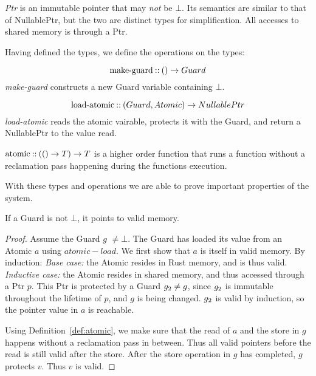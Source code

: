 \begin{definition}[Ptr]
  \emph{Ptr} is an immutable pointer that may \emph{not} be $\bot$. Its semantics are similar to
  that of NullablePtr, but the two are distinct types for simplification. All accesses to shared
  memory is through a Ptr.
\end{definition}


Having defined the types, we define the operations on the types:

\begin{definition}
\begin{equation}\label{eq:make-guard}
  \text{make-guard\:::\:} () \to Guard
\end{equation}
\emph{make-guard} constructs a new Guard variable containing $\bot$.

\begin{equation}\label{eq:load-atomic}
  \text{load-atomic\:::\:} (Guard, Atomic) \to NullablePtr
\end{equation}
\emph{load-atomic} reads the atomic vairable, protects it with the Guard, and return a NullablePtr
to the value read.
\end{definition}

\begin{definition}\label{def:atomic}
  $\text{atomic\:::\:} (() \to T) \to T$ is a higher order function that runs a function without
  a reclamation pass happening during the functions execution.
\end{definition}




With these types and operations we are able to prove important properties of the system.

\begin{theorem}\label{thm:guard-valid}
  If a Guard is not $\bot$, it points to valid memory.
\end{theorem}
\begin{proof}
  Assume the Guard $g$ $\neq \bot$.
  The Guard has loaded its value from an Atomic $a$ using $atomic-load$.
We first show that $a$ is itself in valid memory. By induction:
\emph{Base case:} the Atomic resides in Rust memory, and is thus valid. \emph{Inductive case:} the
Atomic resides in shared memory, and thus accessed through a Ptr $p$.  This Ptr is protected by a
Guard $g\sb{2} \neq g$, since $g\sb{2}$ is immutable throughout the lifetime of $p$, and $g$ is
being changed. $g\sb{2}$ is valid by induction, so the pointer value in $a$ is reachable.

Using Definition~\ref{def:atomic}, we make sure that the read of $a$ and the store in $g$ happens
without a reclamation pass in between. Thus all valid pointers before the read is still valid after
the store.  After the store operation in $g$ has completed, $g$ protects $v$. Thus $v$ is valid.
\end{proof}


